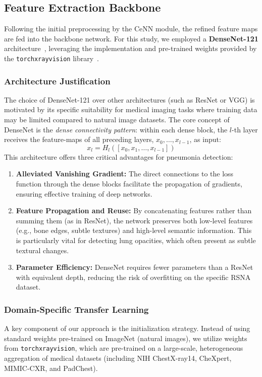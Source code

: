 \documentclass[a4paper,fleqn]{cas-dc}
\begin{document}
\subsection{Feature Extraction Backbone}

Following the initial preprocessing by the CeNN module, the refined feature maps are fed into the backbone network. For this study, we employed a \textbf{DenseNet-121} architecture~\cite{densenet}, leveraging the implementation and pre-trained weights provided by the \texttt{torchxrayvision} library~\cite{torchxray}.

\subsubsection{Architecture Justification}
The choice of DenseNet-121 over other architectures (such as ResNet or VGG) is motivated by its specific suitability for medical imaging tasks where training data may be limited compared to natural image datasets. The core concept of DenseNet is the \textit{dense connectivity pattern}: within each dense block, the $l$-th layer receives the feature-maps of all preceding layers, $x_0, \dots, x_{l-1}$, as input:
\begin{equation}
	x_l = H_l([x_0, x_1, \dots, x_{l-1}])
\end{equation}
This architecture offers three critical advantages for pneumonia detection:
\begin{enumerate}
	\item \textbf{Alleviated Vanishing Gradient:} The direct connections to the loss function through the dense blocks facilitate the propagation of gradients, ensuring effective training of deep networks.
	\item \textbf{Feature Propagation and Reuse:} By concatenating features rather than summing them (as in ResNet), the network preserves both low-level features (e.g., bone edges, subtle textures) and high-level semantic information. This is particularly vital for detecting lung opacities, which often present as subtle textural changes.
	\item \textbf{Parameter Efficiency:} DenseNet requires fewer parameters than a ResNet with equivalent depth, reducing the risk of overfitting on the specific RSNA dataset.
\end{enumerate}

\subsubsection{Domain-Specific Transfer Learning}
A key component of our approach is the initialization strategy. Instead of using standard weights pre-trained on ImageNet (natural images), we utilize weights from \texttt{torchxrayvision}, which are pre-trained on a large-scale, heterogeneous aggregation of medical datasets (including NIH ChestX-ray14, CheXpert, MIMIC-CXR, and PadChest). 
\end{document}
